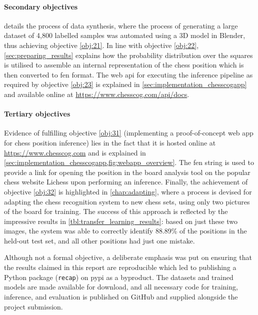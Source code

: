 \documentclass[../report.tex]{subfiles}
\begin{document}
\paragraph{Secondary objectives}
 details the process of data synthesis, where the process of generating a large dataset of 4,800 labelled samples was automated using a 3D model in Blender, thus achieving objective \ref{obj:21}.
In line with objective \ref{obj:22}, \cref{sec:preparing_results} explains how the probability distribution over the squares is utilised to assemble an internal representation of the chess position which is then converted to \gls{fen} format.
The web \gls{api} for executing the inference pipeline as required by objective \ref{obj:23} is explained in \cref{sec:implementation_chesscogapp} and available online at \url{https://www.chesscog.com/api/docs}.

\paragraph{Tertiary objectives}
Evidence of fulfilling objective \ref{obj:31} (implementing a proof-of-concept web app for chess position inference) lies in the fact that it is hosted online at \url{https://www.chesscog.com} and is explained in \cref{sec:implementation_chesscogapp,fig:webapp_overview}.
The \gls{fen} string is used to provide a link for opening the position in the board analysis tool on the popular chess website Lichess upon performing an inference.
Finally, the achievement of objective \ref{obj:32} is highlighted in \cref{chap:adapting}, where a process is devised for adapting the chess recognition system to new chess sets, using only two pictures of the board for training.
The success of this approach is reflected by the impressive results in \cref{tbl:transfer_learning_results}: based on just these two images, the system was able to correctly identify 88.89\% of the positions in the held-out test set, and all other positions had just one mistake.

Although not a formal objective, a deliberate emphasis was put on ensuring that the results claimed in this report are reproducible which led to publishing a Python package (\texttt{recap}) on \gls{pypi} as a byproduct.
The datasets and trained models are made available for download, and all necessary code for training, inference, and evaluation is published on GitHub and supplied alongside the project submission.
\end{document}

